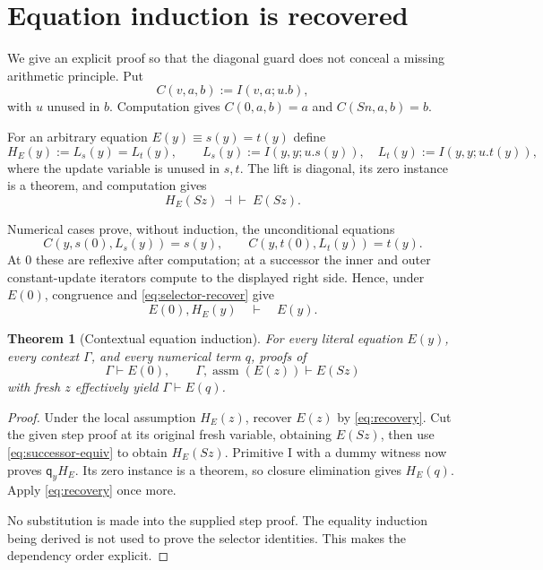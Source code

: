 \documentclass[11pt]{article}
\newtheorem{theorem}{Theorem}[section]
\theoremstyle{definition}\newtheorem{definition}[theorem]{Definition}
\theoremstyle{remark}\newtheorem{remark}[theorem]{Remark}
\newcommand{\assm}{\operatorname{assm}}
\newcommand{\qq}{\mathsf q}
\begin{document}
\section{Equation induction is recovered}
\label{sec:induction}

We give an explicit proof so that the diagonal guard does not conceal a missing arithmetic principle. Put
\[
 C(v,a,b):=I(v,a;u.b),
\]
with $u$ unused in $b$. Computation gives $C(0,a,b)=a$ and $C(Sn,a,b)=b$.

For an arbitrary equation $E(y)\equiv s(y)=t(y)$ define
\begin{equation}\label{eq:lift}
 H_E(y):=L_s(y)=L_t(y),\qquad
 L_s(y):=I(y,y;u.s(y)),\quad L_t(y):=I(y,y;u.t(y)),
\end{equation}
where the update variable is unused in $s,t$. The lift is diagonal, its zero instance is a theorem, and computation gives
\begin{equation}\label{eq:successor-equiv}
 H_E(Sz)\ \dashv\vdash\ E(Sz).
\end{equation}

Numerical cases prove, without induction, the unconditional equations
\begin{equation}\label{eq:selector-recover}
 C(y,s(0),L_s(y))=s(y),\qquad
 C(y,t(0),L_t(y))=t(y).
\end{equation}
At $0$ these are reflexive after computation; at a successor the inner and outer constant-update iterators compute to the displayed right side. Hence, under $E(0)$, congruence and \eqref{eq:selector-recover} give
\begin{equation}\label{eq:recovery}
 E(0),H_E(y)\quad\vdash\quad E(y).
\end{equation}

\begin{theorem}[Contextual equation induction]\label{thm:eqind}
For every literal equation $E(y)$, every context $\Gamma$, and every numerical term $q$, proofs of
\[
 \Gamma\vdash E(0),\qquad
 \Gamma,\assm(E(z))\vdash E(Sz)
\]
with fresh $z$ effectively yield $\Gamma\vdash E(q)$.
\end{theorem}
\begin{proof}
Under the local assumption $H_E(z)$, recover $E(z)$ by \eqref{eq:recovery}. Cut the given step proof at its original fresh variable, obtaining $E(Sz)$, then use \eqref{eq:successor-equiv} to obtain $H_E(Sz)$. Primitive I with a dummy witness now proves $\qq_yH_E$. Its zero instance is a theorem, so closure elimination gives $H_E(q)$. Apply \eqref{eq:recovery} once more.

No substitution is made into the supplied step proof. The equality induction being derived is not used to prove the selector identities. This makes the dependency order explicit.
\end{proof}
\end{document}
